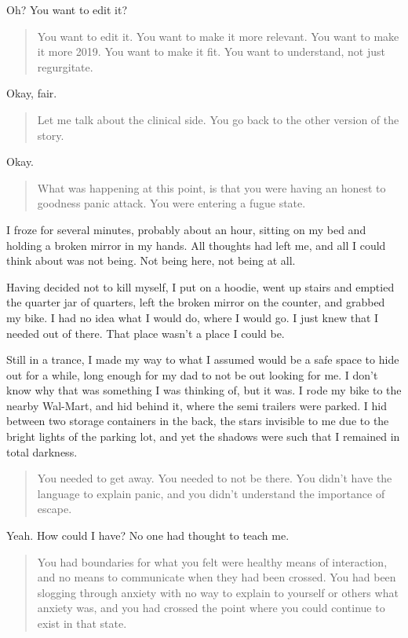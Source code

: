 Oh? You want to edit it?

\begin{quote}
You want to edit it. You want to make it more relevant. You want to make it more 2019. You want to make it fit. You want to understand, not just regurgitate.
\end{quote}

Okay, fair.

\begin{quote}
Let me talk about the clinical side. You go back to the other version of the story.
\end{quote}

Okay.

\begin{quote}
What was happening at this point, is that you were having an honest to goodness panic attack. You were entering a fugue state.
\end{quote}

I froze for several minutes, probably about an hour, sitting on my bed and holding a broken mirror in my hands. All thoughts had left me, and all I could think about was not being. Not being here, not being at all.

Having decided not to kill myself, I put on a hoodie, went up stairs and emptied the quarter jar of quarters, left the broken mirror on the counter, and grabbed my bike. I had no idea what I would do, where I would go. I just knew that I needed out of there. That place wasn't a place I could be.

Still in a trance, I made my way to what I assumed would be a safe space to hide out for a while, long enough for my dad to not be out looking for me. I don't know why that was something I was thinking of, but it was. I rode my bike to the nearby Wal-Mart, and hid behind it, where the semi trailers were parked. I hid between two storage containers in the back, the stars invisible to me due to the bright lights of the parking lot, and yet the shadows were such that I remained in total darkness.

\begin{quote}
You needed to get away. You needed to not be there. You didn't have the language to explain panic, and you didn't understand the importance of escape.
\end{quote}

Yeah. How could I have? No one had thought to teach me.

\begin{quote}
You had boundaries for what you felt were healthy means of interaction, and no means to communicate when they had been crossed. You had been slogging through anxiety with no way to explain to yourself or others what anxiety was, and you had crossed the point where you could continue to exist in that state.
\end{quote}

